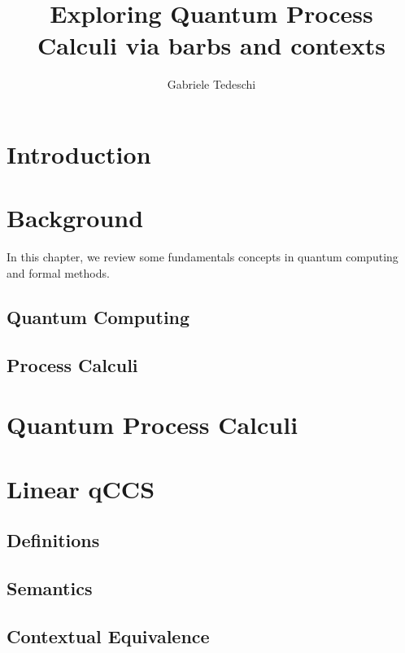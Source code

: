 \documentclass[10pt,a4paper, titlepage]{report}
\title{Exploring Quantum Process Calculi via barbs and contexts }
\author{Gabriele Tedeschi}
\begin{document}
\maketitle

\tableofcontents

\chapter{Introduction}

\chapter{Background}
In this chapter, we review some fundamentals concepts in quantum computing and formal methods.

\section{Quantum Computing}


\section{Process Calculi}	





\chapter{Quantum Process Calculi}






\chapter{Linear qCCS}

\section{Definitions}


\section{Semantics}



\section{Contextual Equivalence}

\end{document}
